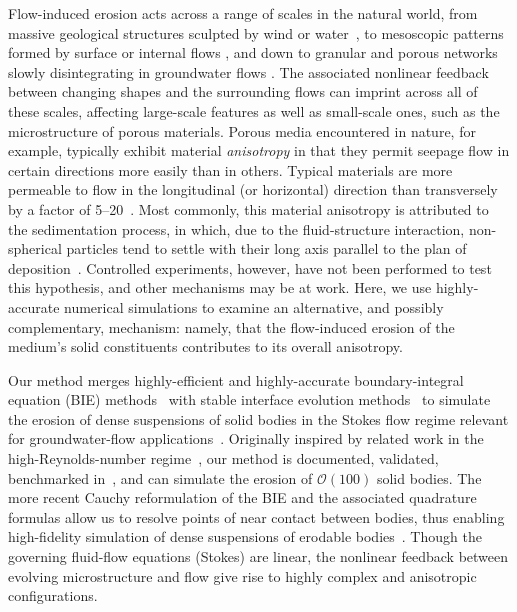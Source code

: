 \documentclass[3p]{elsarticle}
\begin{document}
	Flow-induced erosion acts across a range of scales in the natural world, from massive geological structures sculpted by wind or water~\cite{abrams2009growth, perkins2015amplification, mac2020ultra, sharma2022alcove, mac2022morphological}, to mesoscopic patterns formed by surface or internal flows \cite{berhanu2012shape, bertagni2021hydrodynamic, weady2022anomalous}, and down to granular and porous networks slowly disintegrating in groundwater flows \cite{szymczak2009wormhole, chiu2020viscous, zareei2022temporal}. The associated nonlinear feedback between changing shapes and the surrounding flows can imprint across all of these scales, affecting large-scale features as well as small-scale ones, such as the microstructure of porous materials. Porous media encountered in nature, for example, typically exhibit material {\em anisotropy} in that they permit seepage flow in certain directions more easily than in others.  Typical materials are more permeable to flow in the longitudinal (or horizontal) direction than transversely by a factor of 5--20~\cite{bear1988dynamics, anderson2015applied}. Most commonly, this material anisotropy is attributed to the sedimentation process, in which, due to the fluid-structure interaction, non-spherical particles tend to settle with their long axis parallel to the plan of deposition~\cite{bear1988dynamics}. Controlled experiments, however, have not been performed to test this hypothesis, and other mechanisms may be at work. Here, we use highly-accurate numerical simulations to examine an alternative, and possibly complementary, mechanism: namely, that the flow-induced erosion of the medium's solid constituents contributes to its overall anisotropy.

	Our method merges highly-efficient and highly-accurate boundary-integral equation (BIE) methods~\cite{baker1986boundary, moore2007evaluation} with stable interface evolution methods~\cite{hou-low-she1994, Moore2013} to simulate the erosion of dense suspensions of solid bodies in the Stokes flow regime relevant for groundwater-flow applications~\cite{quaife2018boundary, chiu2020viscous}.  Originally inspired by related work in the high-Reynolds-number regime~\cite{Ristroph2012, Moore2013, Huang2015, MooreCPAM2017}, our method is documented, validated, benchmarked in~\cite{quaife2018boundary}, and can simulate the erosion of $\mathcal{O}(100)$ solid bodies. The more recent Cauchy reformulation of the BIE and the associated  quadrature formulas allow us to resolve points of near contact between bodies, thus enabling high-fidelity simulation of dense suspensions of erodable bodies~\cite{chiu2020viscous}. Though the governing fluid-flow equations (Stokes) are linear, the nonlinear feedback between evolving microstructure and flow give rise to highly complex and anisotropic configurations.
	
\end{document}
